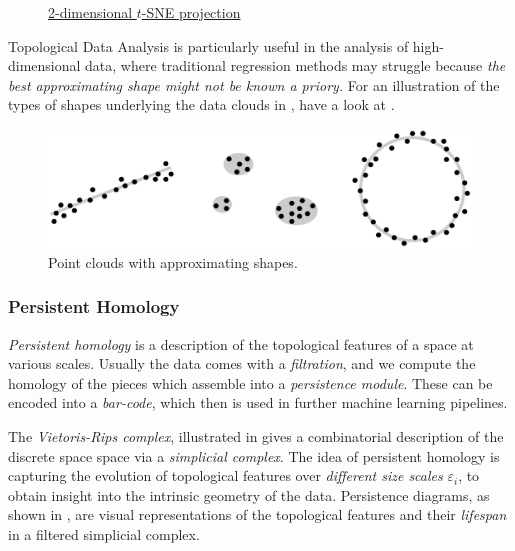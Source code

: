 \documentclass[11pt, a4paper]{amsart}
\begin{document}
\begin{figure}[ht]
\begin{minipage}[b]{0.4\linewidth}
		\caption{
			\href{https://lvdmaaten.github.io/tsne/}{2-dimensional $t$-SNE projection}
		}
		\label{fig:coil_20_tsne}
	\end{minipage}
\end{figure}

Topological Data Analysis is particularly useful in the analysis of high-dimensional data, where traditional regression methods may struggle because \emph{the best approximating shape might not be known a priory.}
For an illustration of the types of shapes underlying the data clouds in , have a look at .

\begin{figure}
	\centering
	\includegraphics[width=0.95\linewidth]{figures/topological_data_analysis/topological_data_analysis_collection_with_shapes}
	\caption{
		Point clouds with approximating shapes.
		\label{fig:topological_data_analysis_collection_with_shapes}
	}
\end{figure}

\subsubsection{Persistent Homology}

\emph{Persistent homology} is a description of the topological features of a space at various scales.
Usually the data comes with a \emph{filtration}, and we compute the homology of the pieces which assemble into a \emph{persistence module}.
These can be encoded into a \emph{bar-code}, which then is used in further machine learning pipelines.

The \emph{Vietoris-Rips complex}, illustrated in  gives a combinatorial description of the discrete space space via a \emph{simplicial complex}.
The idea of persistent homology is capturing the evolution of topological features over \emph{different size scales} $\varepsilon_{i}$, to obtain insight into the intrinsic geometry of the data.
Persistence diagrams, as shown in , are visual representations of the topological features and their \emph{lifespan} in a filtered simplicial complex.
\end{document}
